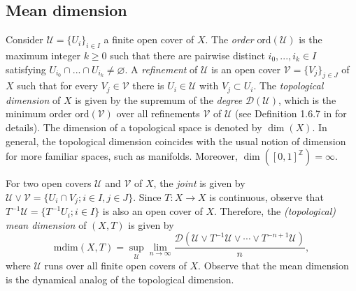 \documentclass[sn-mathphys-num]{sn-jnl}%
\theoremstyle{thmstyleone}%
\theoremstyle{thmstyletwo}%
\theoremstyle{thmstylethree}%
\begin{document}

\subsection{Mean dimension}

Consider $\mathcal{U} = \{U_i\}_{i \in I}$ a finite open cover of $X$. The \textit{order} $\text{ord}(\mathcal{U})$ is the maximum integer $k \geq 0$ such that there are pairwise distinct $i_0, ..., i_k \in I$ satisfying $U_{i_0} \cap ... \cap U_{i_k} \neq \varnothing$. A \textit{refinement} of $\mathcal{U}$ is an open cover $\mathcal{V} = \{V_j\}_{j \in J}$ of $X$ such that for every $V_j \in \mathcal{V}$ there is $U_i \in \mathcal{U}$ with $V_j \subset U_i$. The \textit{topological dimension} of $X$ is given by the supremum of the \textit{degree} $\mathcal{D}(\mathcal{U})$, which is the minimum order $\text{ord}(\mathcal{V})$ over all refinements $\mathcal{V}$ of $\mathcal{U}$ (see Definition 1.6.7 in \cite{engelking_1978} for details). The dimension of a topological space is denoted by $\dim(X)$. In general, the topological dimension coincides with the usual notion of dimension for more familiar spaces, such as manifolds. Moreover, $\dim([0,1]^{\mathbb{Z}}) = \infty$.

For two open covers $\mathcal{U}$ and $\mathcal{V}$ of $X$, the \textit{joint} is given by $\mathcal{U} \vee \mathcal{V} = \{U_i \cap V_j; i \in I, j \in J\}$. Since $T:X \to X$ is continuous, observe that $T^{-1}\mathcal{U} = \{T^{-1}U_i; i \in I\}$ is also an open cover of $X$. Therefore, the \textit{(topological) mean dimension} of $(X, T)$ is given by
\begin{equation*}
    \text{mdim}(X, T) = \sup\limits_{\mathcal{U}} \lim\limits_{n \to \infty} \frac{\mathcal{D}(\mathcal{U} \vee T^{-1}\mathcal{U}\vee \cdots \vee T^{-n+1}\mathcal{U})}{n},
\end{equation*}
where $\mathcal{U}$ runs over all finite open covers of $X$. Observe that the mean dimension is the dynamical analog of the topological dimension.\\
\end{document}
